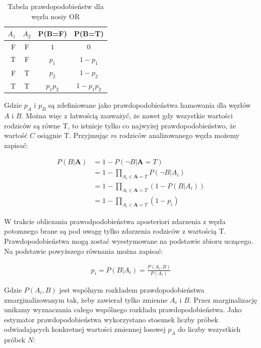 \documentclass{article}
\begin{document}
\begin{table}
\caption{Tabela prawdopodobieństw dla węzła nosiy OR}
\label{nosiy OR}
\centering
\begin{tabular}{|r|c|c|c|}
  \hline 
  $A_1$ & $A_2$ & P(B=F) & P(B=T)\\
  \hline
  F & F & $1$ & $0$\\
  \hline
  T & F & $p_1$ & $1-p_1$ \\
  \hline
  F & T & $p_2$ & $1-p_2$ \\
  \hline
  T & T & $p_1 p_2$ & $1 - p_1 p_2$ \\
  \hline
\end{tabular}
\end{table} 

Gdzie $p_A$ i $p_B$ są zdefiniowane jako prawdopodobieństwa hamowania dla węzłów $A$ i $B$. Można więc z łatwością zauważyć, że nawet gdy wszystkie wartości rodziców są równe T, to istnieje tylko co najwyżej prawdopodobieństwo, że wartość $C$ osiągnie T. Przyjmując $m$ rodziców analizowanego węzła możemy zapisać:

\begin{equation}
\begin{aligned}
	P(B|\mathbf{A}) &= 1 - P(\neg B | \mathbf{A}=T) \\
	&= 1 - \prod_{A_i \in \mathbf{A}=T} P(\neg B | A_i) \\
	&= 1 - \prod_{A_i \in \mathbf{A}=T} (1 - P(B|A_i)) \\
	&= 1 - \prod_{A_i \in \mathbf{A}=T} (1 - p_i)
\end{aligned}
\end{equation}

W trakcie obliczania prawodpodobieństwa aposteriori zdarzenia z węzła potomnego brane są pod uwagę tylko zdarzenia rodziców z wartością T. Prawdopodobieństwa mogą zostać wyestymowane na podstawie zbioru uczącego. Na podstawie powyższego równania można zapisać:

\begin{equation}
\begin{aligned}
	p_i = P(B|A_i) = \frac{P(A_i, B)}{P(A_i)}
\end{aligned}
\end{equation}

Gdzie $P(A_i, B)$ jest wspólnym rozkładem prawdopodobieństwa zmarginalizowanym tak, żeby zawierał tylko zmienne $A_i$ i $B$. Przez marginalizację unikamy wyznaczania całego wspólnego rozkładu prawdopodobieństwa. Jako estymator prawdopodobieństwa wykorzystano stosunek liczby próbek odwiadających konkretnej wartości zmiennej losowej $p_A$ do liczby wszystkich próbek $N$:
\end{document}
